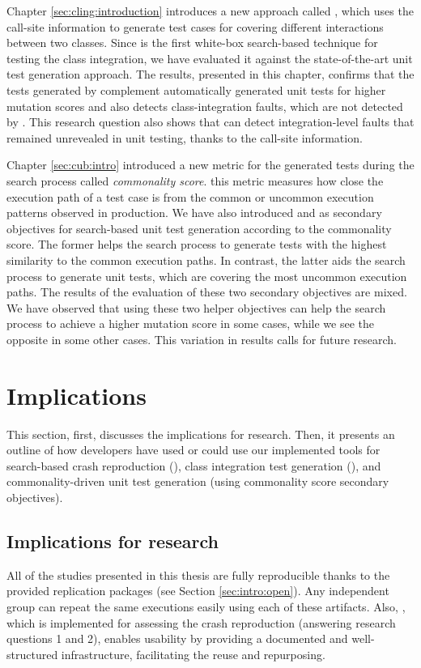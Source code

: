 Chapter \ref{sec:cling:introduction} introduces a new approach called \cling, which uses the call-site information to generate test cases for covering different interactions between two classes. Since \cling is the first white-box search-based technique for testing the class integration, we have evaluated it against the state-of-the-art unit test generation approach. The results, presented in this chapter, confirms that the tests generated by \cling complement automatically generated unit tests for higher mutation scores and also detects class-integration faults, which are not detected by \evosuite. This research question also shows that \cling can detect integration-level faults that remained unrevealed in unit testing, thanks to the call-site information.


Chapter \ref{sec:cub:intro} introduced a new metric for the generated tests during the search process called \emph{commonality score}. this metric measures how close the execution path of a test case is from the common or uncommon execution patterns observed in production. We have also introduced \com and \ucom as secondary objectives for search-based unit test generation according to the commonality score. The former helps the search process to generate tests with the highest similarity to the common execution paths. In contrast, the latter aids the search process to generate unit tests, which are covering the most uncommon execution paths. The results of the evaluation of these two secondary objectives are mixed. We have observed that using these two helper objectives can help the search process to achieve a higher mutation score in some cases, while we see the opposite in some other cases. This variation in results calls for future research.



\section{Implications}

This section, first, discusses the implications for research. Then, it presents an outline of how developers have used or could use our implemented tools for search-based crash reproduction (\botsing), class integration test generation (\cling), and commonality-driven unit test generation (using commonality score secondary objectives).

\subsection{Implications for research}
All of the studies presented in this thesis are fully reproducible thanks to the provided replication packages (see Section \ref{sec:intro:open}). Any independent group can repeat the same executions easily using each of these artifacts.
Also, \exrunner, which is implemented for assessing the crash reproduction (answering research questions 1 and 2), enables usability by providing a documented and well-structured infrastructure, facilitating the reuse and repurposing.



